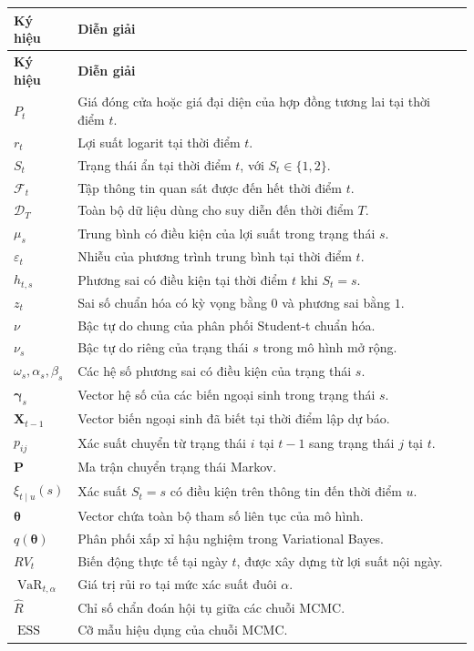 \documentclass[12pt,a4paper]{article}
\numberwithin{equation}{section}
\newcommand{\bm}[1]{\symbf{#1}}
\newcommand{\Data}{\mathcal{D}}
\newcommand{\Info}{\mathcal{F}}
\newcommand{\Param}{\bm{\theta}}
\newcommand{\Xvec}{\bm{X}}
\newcommand{\Pmat}{\bm{P}}
\newcommand{\VaR}{\operatorname{VaR}}
\newcommand{\ESS}{\operatorname{ESS}}
\begin{document}
\begin{longtable}{>{\centering\arraybackslash}p{}p{}}
\toprule
\textbf{Ký hiệu} & \textbf{Diễn giải} \\
\midrule
\endfirsthead
\toprule
\textbf{Ký hiệu} & \textbf{Diễn giải} \\
\midrule
\endhead
$P_t$ & Giá đóng cửa hoặc giá đại diện của hợp đồng tương lai tại thời điểm $t$. \\
$r_t$ & Lợi suất logarit tại thời điểm $t$. \\
$S_t$ & Trạng thái ẩn tại thời điểm $t$, với $S_t\in\{1,2\}$. \\
$\Info_t$ & Tập thông tin quan sát được đến hết thời điểm $t$. \\
$\Data_T$ & Toàn bộ dữ liệu dùng cho suy diễn đến thời điểm $T$. \\
$\mu_s$ & Trung bình có điều kiện của lợi suất trong trạng thái $s$. \\
$\varepsilon_t$ & Nhiễu của phương trình trung bình tại thời điểm $t$. \\
$h_{t,s}$ & Phương sai có điều kiện tại thời điểm $t$ khi $S_t=s$. \\
$z_t$ & Sai số chuẩn hóa có kỳ vọng bằng $0$ và phương sai bằng $1$. \\
$\nu$ & Bậc tự do chung của phân phối Student-t chuẩn hóa. \\
$\nu_s$ & Bậc tự do riêng của trạng thái $s$ trong mô hình mở rộng. \\
$\omega_s,\alpha_s,\beta_s$ & Các hệ số phương sai có điều kiện của trạng thái $s$. \\
$\bm{\gamma}_s$ & Vector hệ số của các biến ngoại sinh trong trạng thái $s$. \\
$\Xvec_{t-1}$ & Vector biến ngoại sinh đã biết tại thời điểm lập dự báo. \\
$p_{ij}$ & Xác suất chuyển từ trạng thái $i$ tại $t-1$ sang trạng thái $j$ tại $t$. \\
$\Pmat$ & Ma trận chuyển trạng thái Markov. \\
$\xi_{t\mid u}(s)$ & Xác suất $S_t=s$ có điều kiện trên thông tin đến thời điểm $u$. \\
$\Param$ & Vector chứa toàn bộ tham số liên tục của mô hình. \\
$q(\Param)$ & Phân phối xấp xỉ hậu nghiệm trong Variational Bayes. \\
$RV_t$ & Biến động thực tế tại ngày $t$, được xây dựng từ lợi suất nội ngày. \\
$\VaR_{t,\alpha}$ & Giá trị rủi ro tại mức xác suất đuôi $\alpha$. \\
$\widehat R$ & Chỉ số chẩn đoán hội tụ giữa các chuỗi MCMC. \\
$\ESS$ & Cỡ mẫu hiệu dụng của chuỗi MCMC. \\
\bottomrule
\end{longtable}
\end{document}
